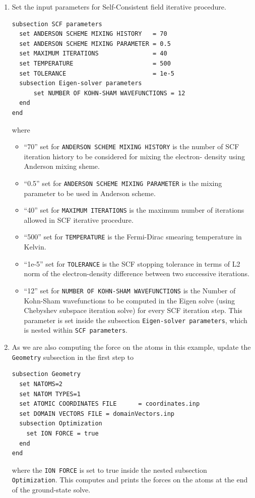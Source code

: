 \begin{enumerate}
\item Set the input parameters for Self-Consistent field iterative procedure.
\begin{verbatim}
subsection SCF parameters
  set ANDERSON SCHEME MIXING HISTORY   = 70
  set ANDERSON SCHEME MIXING PARAMETER = 0.5
  set MAXIMUM ITERATIONS               = 40
  set TEMPERATURE                      = 500
  set TOLERANCE                        = 1e-5
  subsection Eigen-solver parameters
      set NUMBER OF KOHN-SHAM WAVEFUNCTIONS = 12
  end
end	
\end{verbatim}
where
\begin{itemize}		
\item ``70'' set for \verb|ANDERSON SCHEME MIXING HISTORY| is the number of SCF iteration history to be considered for mixing the electron-
density using Anderson mixing sheme.
\item ``0.5'' set for \verb|ANDERSON SCHEME MIXING PARAMETER| is the mixing parameter to be used in Anderson scheme.
\item ``40'' set for \verb|MAXIMUM ITERATIONS| is the maximum number of iterations allowed in SCF iterative procedure.
\item ``500'' set for \verb|TEMPERATURE| is the Fermi-Dirac smearing temperature in Kelvin.
\item ``1e-5'' set for \verb|TOLERANCE| is the SCF stopping tolerance in terms of L2 norm of the electron-density
difference between two successive iterations.
\item ``12'' set for \verb|NUMBER OF KOHN-SHAM WAVEFUNCTIONS| is the Number of Kohn-Sham wavefunctions to be computed in the Eigen solve (using Chebyshev subspace iteration solve) for every SCF iteration step. This parameter is set inside the subsection \verb|Eigen-solver parameters|, which is nested within \verb|SCF parameters|.
\end{itemize}

\item As we are also computing the force on the atoms in this example, update the \verb|Geometry| subsection in the first step to
\begin{verbatim}
subsection Geometry
  set NATOMS=2
  set NATOM TYPES=1
  set ATOMIC COORDINATES FILE      = coordinates.inp 
  set DOMAIN VECTORS FILE = domainVectors.inp
  subsection Optimization
    set ION FORCE = true
  end
end
\end{verbatim}
where the \verb|ION FORCE| is set to true inside the nested subsection \verb|Optimization|. This computes and prints the forces on the atoms at the end of the ground-state solve.


\end{enumerate}
